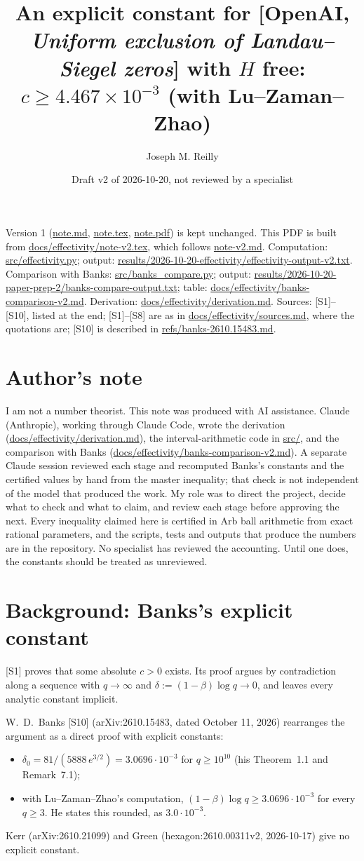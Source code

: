 \documentclass[11pt]{article}
\title{An explicit constant for [OpenAI, \emph{Uniform exclusion of Landau--Siegel zeros}] with $H$ free: $c \ge 4.467\times 10^{-3}$ (with Lu--Zaman--Zhao)}
\author{Joseph M. Reilly}
\date{Draft v2 of 2026-10-20, not reviewed by a specialist}
\begin{document}
\maketitle

\noindent Version 1 (\url{note.md}, \url{note.tex}, \url{note.pdf}) is kept unchanged. This PDF is built from \url{docs/effectivity/note-v2.tex}, which follows \url{note-v2.md}.
Computation: \url{src/effectivity.py}; output: \url{results/2026-10-20-effectivity/effectivity-output-v2.txt}.
Comparison with Banks: \url{src/banks_compare.py}; output: \url{results/2026-10-20-paper-prep-2/banks-compare-output.txt}; table: \url{docs/effectivity/banks-comparison-v2.md}.
Derivation: \url{docs/effectivity/derivation.md}. Sources: [S1]--[S10], listed at the end; [S1]--[S8] are as in \url{docs/effectivity/sources.md}, where the quotations are; [S10] is described in \url{refs/banks-2610.15483.md}.

\section*{Author's note}
I am not a number theorist. This note was produced with AI assistance. Claude (Anthropic), working through Claude Code, wrote the derivation (\url{docs/effectivity/derivation.md}), the interval-arithmetic code in \url{src/}, and the comparison with Banks (\url{docs/effectivity/banks-comparison-v2.md}). A separate Claude session reviewed each stage and recomputed Banks's constants and the certified values by hand from the master inequality; that check is not independent of the model that produced the work. My role was to direct the project, decide what to check and what to claim, and review each stage before approving the next. Every inequality claimed here is certified in Arb ball arithmetic from exact rational parameters, and the scripts, tests and outputs that produce the numbers are in the repository. No specialist has reviewed the accounting. Until one does, the constants should be treated as unreviewed.

\section{Background: Banks's explicit constant}

[S1] proves that some absolute $c>0$ exists. Its proof argues by contradiction along a sequence with $q\to\infty$ and $\delta := (1-\beta)\log q\to 0$, and leaves every analytic constant implicit.

W.~D.~Banks [S10] (arXiv:2610.15483, dated October 11, 2026) rearranges the argument as a direct proof with explicit constants:
\begin{itemize}
\item $\delta_0 = 81/(5888\,e^{3/2}) = 3.0696\cdot 10^{-3}$ for $q\ge 10^{10}$ (his Theorem~1.1 and Remark~7.1);
\item with Lu--Zaman--Zhao's computation, $(1-\beta)\log q\ge 3.0696\cdot10^{-3}$ for every $q\ge 3$. He states this rounded, as $3.0\cdot10^{-3}$.
\end{itemize}
Kerr (arXiv:2610.21099) and Green (hexagon:2610.00311v2, 2026-10-17) give no explicit constant.
\end{document}
